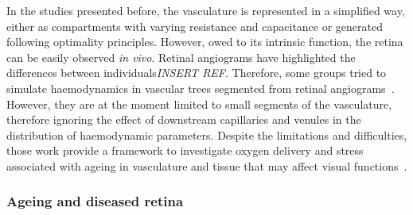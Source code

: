 \documentclass[12pt,a4paper]{article}
\begin{document}
\break

In the studies presented before, the vasculature is represented in a simplified way, either as compartments with varying resistance and capacitance or generated following optimality principles.
However, owed to its intrinsic function, the retina can be easily observed \textit{in vivo}.
Retinal angiograms have highlighted the differences between individuals\emph{INSERT REF}.
Therefore, some groups tried to simulate haemodynamics in vascular trees segmented from retinal angiograms~\cite{Aletti_2016, Malek_2015, Liu_2009, Rebhan_2019}.
However, they are at the moment limited to small segments of the vasculature, therefore ignoring the effect of downstream capillaries and venules in the distribution of haemodynamic parameters.
Despite the limitations and difficulties, those work provide a framework to investigate oxygen delivery and stress associated with ageing in vasculature and tissue that may affect visual functions~\cite{Rickett_2010,Sim_2013,Wessel_2012}.

\subsubsection{Ageing and diseased retina}
\end{document}
